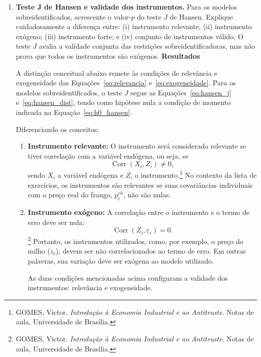 \documentclass[12pt,a4paper]{article}
\begin{document}
\begin{enumerate}[label=\textbf{\arabic*.}]
A comparação entre as colunas da tabela deve ser lida à luz do teste $F$ usual da Equação~\eqref{eq:f_usual}, do $F$ efetivo de MOP da Equação~\eqref{eq:f_efetivo} e do teste $J$ de Hansen das Equações~\eqref{eq:hansen_j} e~\eqref{eq:hansen_dist}.

\item \textbf{Teste J de Hansen e validade dos instrumentos.} Para os modelos
    sobreidentificados, acrescente o valor-$p$ do teste $J$ de Hansen. Explique
    cuidadosamente a diferença entre: (i) instrumento relevante; (ii) instrumento
    exógeno; (iii) instrumento forte; e (iv) conjunto de instrumentos válido. O teste
    $J$ avalia a validade conjunta das restrições sobreidentificadoras, mas não prova
    que todos os instrumentos são exógenos.
\textbf{Resultados}

A distinção conceitual abaixo remete às condições de relevância e exogeneidade das Equações~\eqref{eq:relevancia} e~\eqref{eq:exogeneidade}. Para os modelos sobreidentificados, o teste $J$ segue as Equações~\eqref{eq:hansen_j} e~\eqref{eq:hansen_dist}, tendo como hipótese nula a condição de momento indicada na Equação~\eqref{eq:h0_hansen}.

Diferenciando os conceitos:

\begin{enumerate}[label=(\roman*)]
    \item \textbf{Instrumento relevante:} 
    O instrumento será considerado relevante se tiver correlação com a variável endógena, ou seja, se 
    \[
        \operatorname{Corr}(X_i,Z_i)\neq 0,
    \]
    sendo $X_i$ a variável endógena e $Z_i$ o instrumento.\footnote{GOMES, Victor. \textit{Introdução à Economia Industrial e ao Antitruste}. Notas de aula, Universidade de Brasília.} 
    No contexto da lista de exercícios, os instrumentos são relevantes se suas covariâncias individuais com o preço real do frango, $p_t^{ch}$, não são nulas.

    \item \textbf{Instrumento exógeno:} 
    A correlação entre o instrumento e o termo de erro deve ser nula:
    \[
        \operatorname{Corr}(Z_i,\varepsilon_i)=0.
    \]
    \footnote{GOMES, Victor. \textit{Introdução à Economia Industrial e ao Antitruste}. Notas de aula, Universidade de Brasília.}
    Portanto, os instrumentos utilizados, como, por exemplo, o preço do milho ($z_t$), devem ser não correlacionados ao termo de erro. Em outras palavras, sua variação deve ser exógena ao modelo utilizado.

    As duas condições mencionadas acima configuram a validade dos instrumentos: relevância e exogeneidade.


\end{enumerate}
\end{enumerate}
\end{document}
